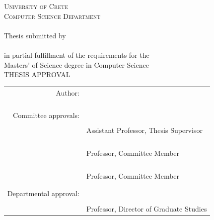 \documentclass[a4paper,11pt,twoside,openany]{book}
\begin{document}
\begin{titlepage}

\begin{center}
\textsc{University of Crete}\\
\textsc{Computer Science Department}\\
\vspace{0.4cm}
\noindent {\textbf{\thesistitle{}}}\\
\vspace{0.4cm}
\noindent Thesis submitted by\\
\textbf{\owner{}}\\
in partial fulfillment of the requirements for the\\
Masters' of Science degree in Computer Science\\
\vspace{0.4cm} THESIS APPROVAL

\vspace{0.4cm}

\begin{tabular}{rl}
\\
Author: & \underline{\phantom{123456789012345678901234567890123456789012}}\\
    & \owner{}\\
    \\
    \\
    \\
Committee approvals: & \underline{\phantom{123456789012345678901234567890123456789012}}\\
    & \firstprof{}\\
    & {\small Assistant Professor, Thesis Supervisor}\\
    \vspace{0.2cm}
    \\
    \\
& \underline{\phantom{123456789012345678901234567890123456789012}}\\
    & \secondprof{}\\
    & {\small Professor, Committee Member}\\
    \vspace{0.2cm}
    \\
    \\
& \underline{\phantom{123456789012345678901234567890123456789012}}\\
    & \thirdprof{}\\
    & {\small  Professor, Committee Member}\\
    \vspace{0.2cm}
    \\
    \\
\hspace{1.4ex}Departmental approval: & \underline{\phantom{123456789012345678901234567890123456789012}}\\
    & \csdchair{}\\
    & {\small Professor, Director of Graduate Studies}\\
\end{tabular}
\\


\end{center}
\end{titlepage}
\end{document}
